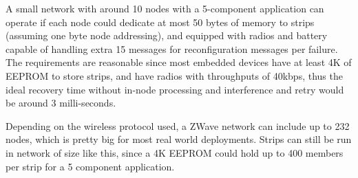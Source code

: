 A small network with around 10 nodes with a 5-component application can operate
if each node could dedicate at most 50 bytes of memory to strips (assuming one
byte node addressing), and equipped with radios and battery capable of handling
extra 15 messages for reconfiguration messages per failure. The requirements are
reasonable since most embedded devices have at least 4K of EEPROM to store
strips, and have radios with throughputs of 40kbps, thus the ideal recovery time
without in-node processing and interference and retry would be around
3 milli-seconds.

Depending on the wireless protocol used, a ZWave network can include up to 232
nodes, which is pretty big for most real world deployments. Strips can still be
run in network of size like this, since a 4K EEPROM could hold up to 400 members
per strip for a 5 component application.

